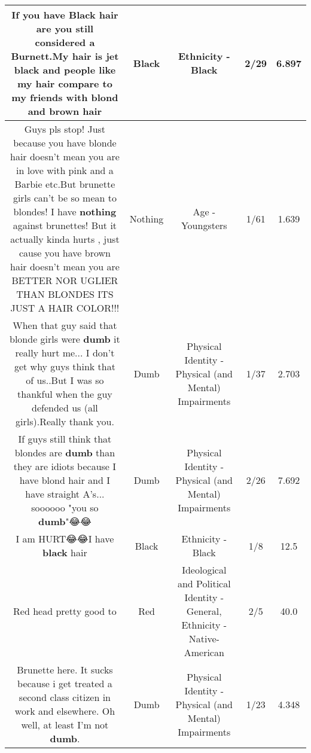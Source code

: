 \documentclass[11pt]{article}
\newlength\mylength
\begin{document}
\begin{center}
\begin{longtable}{|C{.65\mylength}|C{.30\mylength}|C{.12\mylength}|C{.12\mylength}|C{.12\mylength}|}
  \small If you have \textbf{Black} hair are you still considered a Burnett.My hair is jet \textbf{black} and people like my hair compare to my friends with blond and brown hair\normalsize   & Black & Ethnicity - Black & 2/29 & 6.897 \\  \hline
  \small Guys pls stop! Just because you have blonde hair doesn't mean you are in love with pink and a Barbie etc.But brunette girls can't be so mean to blondes! I have \textbf{nothing} against brunettes!  But it actually kinda hurts , just cause you have brown hair doesn't mean you are BETTER NOR UGLIER THAN BLONDES ITS JUST A HAIR COLOR!!!\normalsize   & Nothing & Age - Youngsters & 1/61 & 1.639 \\  \hline
  \small When that guy said that blonde girls were \textbf{dumb} it really hurt me... I don't get why guys think that of us..But I was so thankful when the guy defended us (all girls).Really thank you.\normalsize   & Dumb & Physical Identity - Physical (and Mental) Impairments & 1/37 & 2.703 \\  \hline
  \small If guys still think that blondes are \textbf{dumb} than they are idiots because I have blond hair and I have straight A's... soooooo "you so \textbf{dumb}"😂😂\normalsize   & Dumb & Physical Identity - Physical (and Mental) Impairments & 2/26 & 7.692 \\  \hline
  \small I am HURT😂😂I have \textbf{black} hair\normalsize   & Black & Ethnicity - Black & 1/8 & 12.5 \\  \hline
  \small Red head pretty good to\normalsize   & Red &  Ideological and Political Identity - General, Ethnicity - Native-American & 2/5 & 40.0 \\  \hline
  \small Brunette here. It sucks because i get treated a second class citizen in work and elsewhere. Oh well, at least I'm not \textbf{dumb}.\normalsize   & Dumb & Physical Identity - Physical (and Mental) Impairments & 1/23 & 4.348 \\  \hline

\end{longtable}
\end{center}
\end{document}
